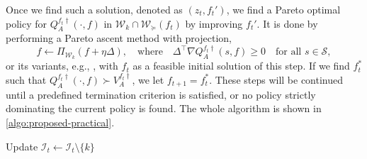 \documentclass{acml}
\providecommand{\T}{\ensuremath{^{\mathrm{T}}}} %
\renewcommand{\geq}{\geqslant} %
\DeclarePairedDelimiter{\abs}{\lvert}{\rvert}
\begin{document}
Once we find such a solution, denoted as $(z_t, f_t')$, we find a Pareto optimal policy for $Q_A^{f_t\dagger}(\cdot, f)$ in $\mathcal{W}_k \cap \mathcal{W}_{\succcurlyeq}(f_t)$ by improving $f_t'$. It is done by performing a Pareto ascent method with projection, 
\begin{equation}
f \gets \Pi_{\mathcal{W}_k}( f + \eta \Delta ), \quad \text{where} \quad \Delta^{\top} \nabla Q_A^{f_t\dagger}(s, f) \geq 0 \quad \text{for all } s \in \mathcal{S},\label{eq:pareto-ascent}
\end{equation}
or its variants, e.g., \citet{Harada2006pdm}, with $f_t$ as a feasible initial solution of this step.
If we find $f_t^*$ such that $Q_A^{f_t\dagger}(\cdot, f) \succ V_A^{f_t\dagger}$, we let $f_{t+1} = f_t^*$. These steps will be continued until a predefined termination criterion is satisfied, or no policy strictly dominating the current policy is found. 
The whole algorithm is shown in \cref{algo:proposed-practical}.


\begin{algorithm}[H]
	\caption{Practical Pareto-Optimal Policy Iteration}
	\label{algo:proposed-practical}
	\begin{algorithmic}[1]
        \ENDIF
        \STATE Update $\mathcal{I}_t \gets \mathcal{I}_t\setminus\{k\}$
        \ENDWHILE
		\ENDFOR
	\end{algorithmic}
\end{algorithm}
\end{document}
